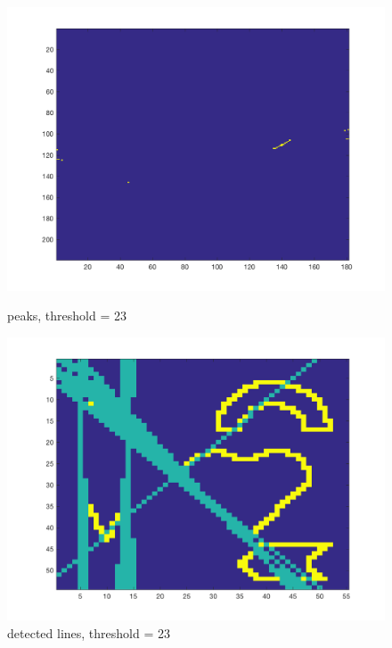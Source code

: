 \documentclass[paper=a4, fontsize=11pt]{scrartcl} %
\numberwithin{equation}{section} %
\numberwithin{figure}{section} %
\numberwithin{table}{section} %
\begin{document}
\begin{figure}[H]
  \centering
  \begin{minipage}[b]{0.49\textwidth}
    \includegraphics[width=\textwidth]{peaks_threshold_23.png}
    \caption{peaks, threshold = 23}
  \end{minipage}
  \hfill
  \begin{minipage}[b]{0.49\textwidth}
    \includegraphics[width=\textwidth]{edgeDetection_threshold_23.png}
    \caption{detected lines, threshold = 23}
  \end{minipage}
\end{figure}
\end{document}
